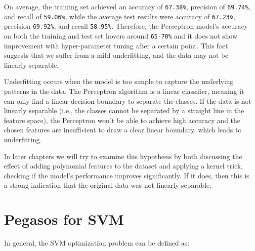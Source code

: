 On average, the training set achieved an accuracy of \texttt{67.38\%}, precision of \texttt{69.74\%}, and recall of \texttt{59.06\%}, while the average test results were accuracy of \texttt{67.23\%}, precision \texttt{69.92\%}, and recall \texttt{58.95\%}. Therefore, the Perceptron model's accuracy on both the training and test set hovers around \texttt{65-70\%} and it does not show improvement with hyper-parameter tuning after a certain point. This fact suggests that we suffer from a mild underfitting, and the data may not be linearly separable.

Underfitting occurs when the model is too simple to capture the underlying patterns in the data. The Perceptron algorithm is a linear classifier, meaning it can only find a linear decision boundary to separate the classes. If the data is not linearly separable (i.e., the classes cannot be separated by a straight line in the feature space), the Perceptron won't be able to achieve high accuracy and the chosen features are insufficient to draw a clear linear boundary, which leads to underfitting.

In later chapters we will try to examine this hypothesis by both discussing the effect of adding polynomial features to the dataset and applying a kernel trick, checking if the model's performance improves significantly. If it does, then this is a strong indication that the original data was not linearly separable.

\section{Pegasos for SVM}

In general, the SVM optimization problem can be defined as:

